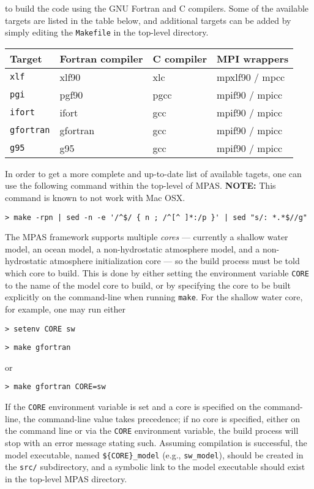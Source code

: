 \noindent to build the code using the GNU Fortran and C compilers. Some of the available targets are listed in the table below, and additional
targets can be added by simply editing the {\tt Makefile} in the top-level directory.

\vspace{12pt}
\begin{longtable}{| l | l | l | l |}
\hline
Target & Fortran compiler & C compiler & MPI wrappers \\ \hline \hline
{\tt xlf} & xlf90 & xlc & mpxlf90 / mpcc \\ \hline
{\tt pgi} & pgf90 & pgcc & mpif90 / mpicc \\ \hline
{\tt ifort} & ifort & gcc & mpif90 / mpicc \\ \hline
{\tt gfortran} & gfortran & gcc & mpif90 / mpicc \\ \hline
{\tt g95} & g95 & gcc & mpif90 / mpicc \\ \hline
\end{longtable}
\vspace{12pt}

In order to get a more complete and up-to-date list of available tagets, one can use the following command within the top-level of MPAS. {\bf NOTE: }This command is known to not work with Mac OSX.
{\small
\begin{verbatim}
> make -rpn | sed -n -e '/^$/ { n ; /^[^ ]*:/p }' | sed "s/: *.*$//g"
\end{verbatim}
}

The MPAS framework supports multiple {\em cores} --- currently a shallow water
model, an ocean model, a non-hydrostatic atmosphere model, and a non-hydrostatic atmosphere initialization core --- so the build
process must be told which core to build. This is done by either setting the environment variable
{\tt CORE} to the name of the model core to build, or by specifying the core to be built explicitly on the command-line
when running {\tt make}. For the shallow water core, for example, one may run either

\vspace{12pt}
{\tt > setenv CORE sw}

{\tt > make gfortran}
\vspace{12pt}

\noindent or

\vspace{12pt}
{\tt > make gfortran CORE=sw}
\vspace{12pt}

If the {\tt CORE} environment variable is set and a core is specified on the command-line, the command-line value takes precedence; if no core
is specified, either on the command line or via the {\tt CORE} environment variable, the build process will stop with an error message stating such.
Assuming compilation is successful, the model executable, named {\tt \$\{CORE\}\_model} (e.g., {\tt sw\_model}), should
be created in the {\tt src/} subdirectory, and a symbolic link to the model executable 
should exist in the top-level MPAS directory.

